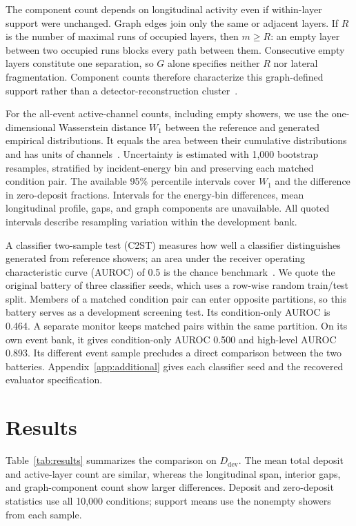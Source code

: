 \documentclass[11pt]{article}
\newcommand{\Ddev}{D_{\mathrm{dev}}}
\begin{document}
The component count depends on longitudinal activity even if within-layer support were unchanged. Graph edges join only the same or adjacent layers. If $R$ is the number of maximal runs of occupied layers, then $m\geq R$: an empty layer between two occupied runs blocks every path between them. Consecutive empty layers constitute one separation, so $G$ alone specifies neither $R$ nor lateral fragmentation. Component counts therefore characterize this graph-defined support rather than a detector-reconstruction cluster~\cite{atlastopocluster}.

For the all-event active-channel counts, including empty showers, we use the one-dimensional Wasserstein distance $W_1$ between the reference and generated empirical distributions. It equals the area between their cumulative distributions and has units of channels~\cite{kansalmetrics}. Uncertainty is estimated with 1,000 bootstrap resamples, stratified by incident-energy bin and preserving each matched condition pair. The available 95\% percentile intervals cover $W_1$ and the difference in zero-deposit fractions. Intervals for the energy-bin differences, mean longitudinal profile, gaps, and graph components are unavailable. All quoted intervals describe resampling variation within the development bank.

A classifier two-sample test (C2ST) measures how well a classifier distinguishes generated from reference showers; an area under the receiver operating characteristic curve (AUROC) of 0.5 is the chance benchmark~\cite{c2st,kansalmetrics}. We quote the original battery of three classifier seeds, which uses a row-wise random train/test split. Members of a matched condition pair can enter opposite partitions, so this battery serves as a development screening test. Its condition-only AUROC is 0.464. A separate monitor keeps matched pairs within the same partition. On its own event bank, it gives condition-only AUROC 0.500 and high-level AUROC 0.893. Its different event sample precludes a direct comparison between the two batteries. Appendix~\ref{app:additional} gives each classifier seed and the recovered evaluator specification.

\section{Results}
\label{sec:results}

Table~\ref{tab:results} summarizes the comparison on $\Ddev$. The mean total deposit and active-layer count are similar, whereas the longitudinal span, interior gaps, and graph-component count show larger differences. Deposit and zero-deposit statistics use all 10,000 conditions; support means use the nonempty showers from each sample.
\end{document}

